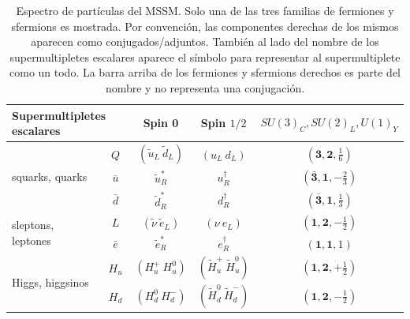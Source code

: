 \begin{table} 

	\centering

	\caption{Espectro de partículas del MSSM. Solo una de las tres familias de fermiones y sfermions es mostrada. Por convención, las componentes derechas de los mismos aparecen como conjugados/adjuntos. También al lado del nombre de los supermultipletes escalares aparece el símbolo para representar al supermultiplete como un todo. La barra arriba de los fermiones y sfermions derechos es parte del nombre y no representa una conjugación. }

	\begin{tabular}{ l c | c c c}

	\hline
	\hline

		\multicolumn{2}{l|}{Supermultipletes escalares} & Spin 0 & Spin $1/2$ & $SU(3)_C, SU(2)_L, U(1)_Y$ \\

		\hline
		\hline

		\multirow{3}{*}{squarks, quarks} & $Q$ & $(\tilde{u}_L\ \tilde{d}_L)$ & $(u_L\ d_L)$ & $(\textbf{3}, \textbf{2}, \frac{1}{6})$ \\
		 & $\bar{u}$ & $\tilde{u}_R^*$ & $u_R^{\dagger}$ & $(\bar{\textbf{3}}, \textbf{1}, -\frac{2}{3})$ \\
		 & $\bar{d}$ & $\tilde{d}_R^*$ & $d_R^{\dagger}$ & $(\bar{\textbf{3}}, \textbf{1}, \frac{1}{3})$ \\

		\hline

		\multirow{2}{*}{sleptons, leptones} & $L$ & $(\tilde{\nu}\ \tilde{e}_L)$ & $(\nu\ e_L)$ & $(\textbf{1}, \textbf{2}, -\frac{1}{2})$ \\
		 & $\bar{e}$ & $\tilde{e}_R^*$ & $e_R^{\dagger}$ & $(\textbf{1}, \textbf{1}, 1)$ \\

		\hline

		\multirow{2}{*}{Higgs, higgsinos} & $H_u$ & $(H_u^+\ H_u^0)$ & $(\widetilde{H}_u^+\ \widetilde{H}_u^0)$ & $(\textbf{1}, \textbf{2}, +\frac{1}{2})$ \\
		 & $H_d$ & $(H_d^0\ H_d^-)$ & $(\widetilde{H}_d^0\ \widetilde{H}_d^-)$ & $(\textbf{1}, \textbf{2}, -\frac{1}{2})$ \\


		\hline
		\hline


\end{tabular}
\end{table}
